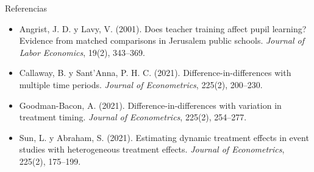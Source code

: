 \documentclass[10pt,aspectratio=169]{beamer}
\begin{document}
\begin{frame}{Referencias}
  \small
  \begin{itemize}
    \item Angrist, J. D. y Lavy, V. (2001). Does teacher training affect pupil learning? Evidence from matched comparisons in Jerusalem public schools. \emph{Journal of Labor Economics}, 19(2), 343--369.
    \item Callaway, B. y Sant'Anna, P. H. C. (2021). Difference-in-differences with multiple time periods. \emph{Journal of Econometrics}, 225(2), 200--230.
    \item Goodman-Bacon, A. (2021). Difference-in-differences with variation in treatment timing. \emph{Journal of Econometrics}, 225(2), 254--277.
    \item Sun, L. y Abraham, S. (2021). Estimating dynamic treatment effects in event studies with heterogeneous treatment effects. \emph{Journal of Econometrics}, 225(2), 175--199.
  \end{itemize}
\end{frame}
\end{document}
